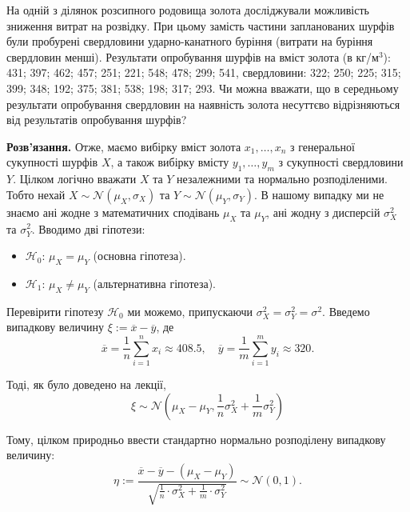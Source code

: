 \documentclass{../hw_template}
\begin{document}
\begin{problem}
    На одній з ділянок розсипного родовища золота досліджували можливість
зниження витрат на розвідку. При цьому замість частини запланованих
шурфів були пробурені свердловини ударно-канатного буріння (витрати на
буріння свердловин менші). Результати опробування шурфів на вміст золота
(в кг/$\text{м}^3$): 431; 397; 462; 457; 251; 221; 548; 478; 299; 541, свердловини: 322; 250;
225; 315; 399; 348; 192; 375; 381; 538; 198; 317; 293.
Чи можна вважати, що в середньому результати опробування свердловин на
наявність золота несуттєво відрізняються від результатів опробування шурфів?
\end{problem}

\textbf{Розв'язання.} Отже, маємо вибірку вміст золота $x_1,\dots,x_n$ з генеральної 
сукупності шурфів $X$, а також вибірку вмісту $y_1,\dots,y_m$ з сукупності
свердловини  $Y$. Цілком логічно вважати $X$ та $Y$ незалежними та 
нормально розподіленими. Тобто нехай $X \sim \mathcal{N}(\mu_X,\sigma_X)$ та 
$Y \sim \mathcal{N}(\mu_Y,\sigma_Y)$. В нашому випадку ми не знаємо ані жодне 
з математичних сподівань $\mu_X$ та $\mu_Y$, ані жодну з дисперсій $\sigma_X^2$ та $\sigma_Y^2$.
Вводимо дві гіпотези:
\begin{itemize}
    \item $\mathcal{H}_0$: $\mu_X = \mu_Y$ (основна гіпотеза).
    \item $\mathcal{H}_1$: $\mu_X \neq \mu_Y$ (альтернативна гіпотеза).
\end{itemize}

Перевірити гіпотезу $\mathcal{H}_0$ ми можемо, припускаючи $\sigma_X^2 = \sigma_Y^2 = \sigma^2$. Введемо випадкову величину $\xi := \overline{x} - \overline{y}$, де
\begin{equation*}
    \overline{x} = \frac{1}{n}\sum_{i=1}^n x_i \approx 408.5, \quad \overline{y} = \frac{1}{m}\sum_{i=1}^m y_i \approx 320.
\end{equation*}

Тоді, як було доведено на лекції, 
\begin{equation*}
    \xi \sim \mathcal{N}\left(\mu_X - \mu_Y, \frac{1}{n}\sigma_X^2 + \frac{1}{m}\sigma_Y^2\right)
\end{equation*}

Тому, цілком природньо ввести стандартно нормально розподілену випадкову величину:
\begin{equation*}
    \eta := \frac{\overline{x} - \overline{y} - (\mu_X - \mu_Y)}{\sqrt{\frac{1}{n} \cdot \sigma_X^2 + \frac{1}{m} \cdot \sigma_Y^2}} \sim \mathcal{N}(0,1).
\end{equation*}
\end{document}
